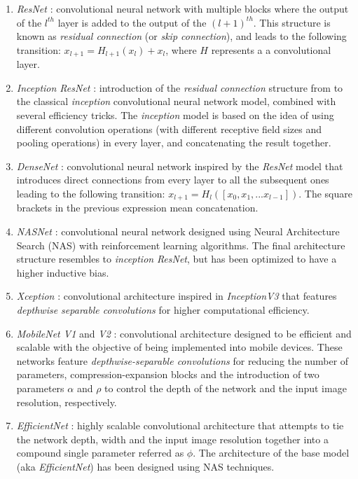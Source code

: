 \documentclass{elsarticle}
\begin{document}
    \begin{enumerate}
    	\item \textit{ResNet} \citep{he2016}: convolutional neural network with multiple blocks where the output of the $l^{th}$ layer is added to the output of the $(l+1)^{th}$. This structure is known as \textit{residual connection} (or \textit{skip connection}), and leads to the following transition: $x_{l+1} = H_{l+1}(x_{l}) + x_l$, where $H$ represents a a convolutional layer.
    	\item \textit{Inception ResNet} \citep{szegedy2017}: introduction of the \textit{residual connection} structure from \citep{he2016} to the classical \textit{inception} convolutional neural network model, combined with several efficiency tricks. The \textit{inception} model is based on the idea of using different convolution operations (with different receptive field sizes and pooling operations) in every layer, and concatenating the result together. 
    	\item \textit{DenseNet} \citep{huang2017}: convolutional neural network inspired by the \textit{ResNet} model \citep{he2016} that introduces direct connections from every layer to all the subsequent ones leading to the following transition: $x_{l+1} = H_l([x_0, x_1, ... x_{l-1}])$. The square brackets in the previous expression mean concatenation. 
    	\item \textit{NASNet} \citep{pham2018}: convolutional neural network designed using Neural Architecture Search (NAS) with reinforcement learning algorithms. The final architecture structure resembles to \textit{inception} \textit{ResNet}, but has been optimized to have a higher inductive bias.
    	\item \textit{Xception} \citep{chollet2017}: convolutional architecture inspired in \textit{InceptionV3}  \citep{szegedy2016} that features \textit{depthwise separable convolutions} for higher computational efficiency.
    	\item \textit{MobileNet V1} and \textit{V2} \citep{howard2017, sandler2018}: convolutional architecture designed to be efficient and scalable with the objective of being implemented into mobile devices. These networks feature \textit{depthwise-separable convolutions} for reducing the number of parameters, compression-expansion blocks and the introduction of two parameters $\alpha$ and $\rho$ to control the depth of the network and the input image resolution, respectively.
    	\item \textit{EfficientNet} \citep{tan2019}: highly scalable convolutional architecture that attempts to tie the network depth, width and the input image resolution  together into a compound single parameter referred as $\phi$. The architecture of the base model (aka \textit{EfficientNet}) has been designed using NAS techniques.
    \end{enumerate}
	
\end{document}
